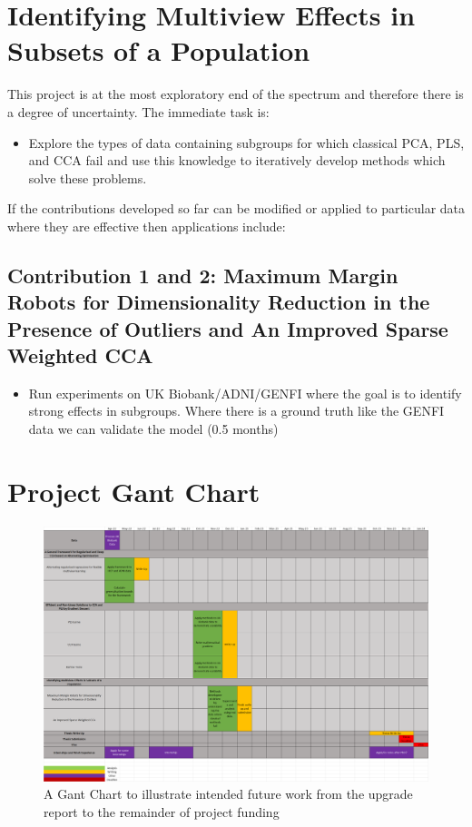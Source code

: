 \section{Identifying Multiview Effects in Subsets of a Population}

This project is at the most exploratory end of the spectrum and therefore there is a degree of uncertainty. The immediate task is:

\begin{itemize}
    \item Explore the types of data containing subgroups for which classical PCA, PLS, and CCA fail and use this knowledge to iteratively develop methods which solve these problems.
\end{itemize}

If the contributions developed so far can be modified or applied to particular data where they are effective then applications include:

\subsection{\textbf{Contribution 1 and 2:} Maximum Margin Robots for Dimensionality Reduction in the Presence of Outliers and An Improved Sparse Weighted CCA}
\begin{itemize}
    \item Run experiments on UK Biobank/ADNI/GENFI where the goal is to identify strong effects in subgroups. Where there is a ground truth like the GENFI data we can validate the model (0.5 months)
\end{itemize}

\section{Project Gant Chart}

\begin{figure}[ht]
\centerline{\includegraphics[width=\columnwidth]{chapters/futurework/PhDGant.png}}
\caption{A Gant Chart to illustrate intended future work from the upgrade report to the remainder of project funding}
\label{icml-historical}
\end{figure}